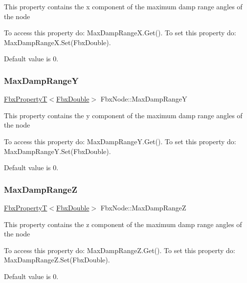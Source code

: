 This property contains the x component of the maximum damp range angles of the node

To access this property do\+: Max\+Damp\+Range\+X.\+Get(). To set this property do\+: Max\+Damp\+Range\+X.\+Set(\+Fbx\+Double).

Default value is 0. \mbox{\label{class_fbx_node_ad4259eb8b56aab70de11311ce28f1ccf}} 
\subsubsection{\texorpdfstring{Max\+Damp\+RangeY}{MaxDampRangeY}}
{\footnotesize\ttfamily \hyperlink{class_fbx_property_t}{Fbx\+PropertyT}$<$\hyperlink{fbxtypes_8h_a171e72a1c46fc15c1a6c9c31948c1c5b}{Fbx\+Double}$>$ Fbx\+Node\+::\+Max\+Damp\+RangeY}

This property contains the y component of the maximum damp range angles of the node

To access this property do\+: Max\+Damp\+Range\+Y.\+Get(). To set this property do\+: Max\+Damp\+Range\+Y.\+Set(\+Fbx\+Double).

Default value is 0. \mbox{\label{class_fbx_node_a29e4e0946b14c49abab84c3ec7bc0a1a}} 
\subsubsection{\texorpdfstring{Max\+Damp\+RangeZ}{MaxDampRangeZ}}
{\footnotesize\ttfamily \hyperlink{class_fbx_property_t}{Fbx\+PropertyT}$<$\hyperlink{fbxtypes_8h_a171e72a1c46fc15c1a6c9c31948c1c5b}{Fbx\+Double}$>$ Fbx\+Node\+::\+Max\+Damp\+RangeZ}

This property contains the z component of the maximum damp range angles of the node

To access this property do\+: Max\+Damp\+Range\+Z.\+Get(). To set this property do\+: Max\+Damp\+Range\+Z.\+Set(\+Fbx\+Double).

Default value is 0. \mbox{\label{class_fbx_node_af76542d55cf747b4d133d9b4d2e703f7}} 
